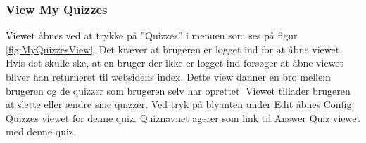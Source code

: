 \subsubsection{View My Quizzes}
Viewet åbnes ved at trykke på ''Quizzes'' i menuen som ses på figur \ref{fig:MyQuizzesView}. Det kræver at brugeren er logget ind for at åbne viewet. Hvis det skulle ske, at en bruger der ikke er logget ind forsøger at åbne viewet bliver han returneret til websidens index.
Dette view danner en bro mellem brugeren og de quizzer som brugeren selv har oprettet. Viewet tillader brugeren at slette eller ændre sine quizzer. Ved tryk på blyanten under Edit åbnes Config Quizzes viewet for denne quiz. Quiznavnet agerer som link til Answer Quiz viewet med denne quiz. 

